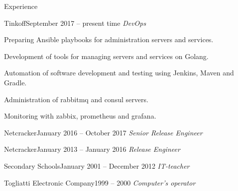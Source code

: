 \documentclass{resume} %
\begin{document}
\begin{rSection}{Experience}

\begin{rSubsection}{Tinkoff}{September 2017 -- present time}{}{} %
{\em DevOps\/} \par
\item Preparing Ansible playbooks for administration servers and services.
\item Development of tools for managing servers and services on Golang.
\item Automation of software development and testing using Jenkins, Maven and Gradle.
\item Administration of rabbitmq and consul servers.
\item Monitoring with zabbix, prometheus and grafana.
\end{rSubsection}

\begin{rSubsection}{Netcracker}{January 2016 -- October 2017}{}{} %
{\em Senior Release Engineer\/} \par
\end{rSubsection}

\begin{rSubsection}{Netcracker}{January 2013 -- January 2016}{}{} %
{\em Release Engineer\/} \par
\end{rSubsection}

\begin{rSubsection}{Secondary Schools}{January 2001 -- December 2012}{}{} %
{\em IT-teacher\/}
\end{rSubsection}

\begin{rSubsection}{Togliatti Electronic Company}{1999 -- 2000}{}{} %
{\em Computer's operator\/}
\end{rSubsection}




\end{rSection}
\end{document}
